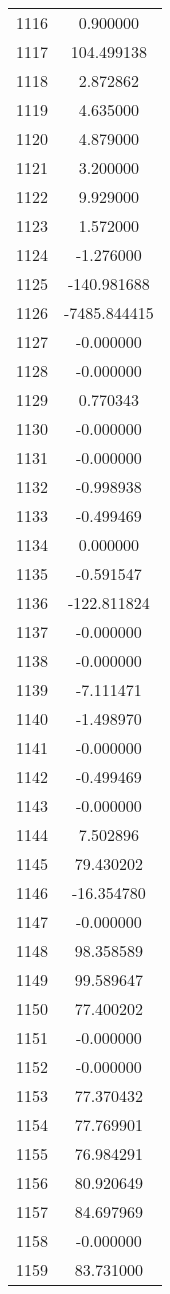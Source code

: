 \documentclass[12pt]{article}
\begin{document}
\begin{longtable}{@{}cc@{}}
1116 & 0.900000 \\
1117 & 104.499138 \\
1118 & 2.872862 \\
1119 & 4.635000 \\
1120 & 4.879000 \\
1121 & 3.200000 \\
1122 & 9.929000 \\
1123 & 1.572000 \\
1124 & -1.276000 \\
1125 & -140.981688 \\
1126 & -7485.844415 \\
1127 & -0.000000 \\
1128 & -0.000000 \\
1129 & 0.770343 \\
1130 & -0.000000 \\
1131 & -0.000000 \\
1132 & -0.998938 \\
1133 & -0.499469 \\
1134 & 0.000000 \\
1135 & -0.591547 \\
1136 & -122.811824 \\
1137 & -0.000000 \\
1138 & -0.000000 \\
1139 & -7.111471 \\
1140 & -1.498970 \\
1141 & -0.000000 \\
1142 & -0.499469 \\
1143 & -0.000000 \\
1144 & 7.502896 \\
1145 & 79.430202 \\
1146 & -16.354780 \\
1147 & -0.000000 \\
1148 & 98.358589 \\
1149 & 99.589647 \\
1150 & 77.400202 \\
1151 & -0.000000 \\
1152 & -0.000000 \\
1153 & 77.370432 \\
1154 & 77.769901 \\
1155 & 76.984291 \\
1156 & 80.920649 \\
1157 & 84.697969 \\
1158 & -0.000000 \\
1159 & 83.731000 \\

\end{longtable}
\end{document}
